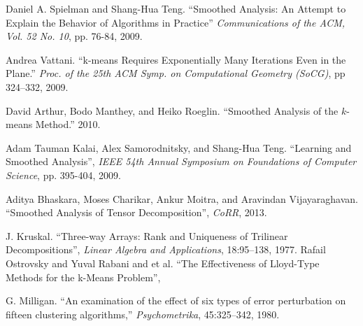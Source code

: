 \documentclass[11pt]{article}
\theoremstyle{definition}
\begin{document}
\begin{multicols}{2}
\begin{thebibliography}{1}
    Daniel A. Spielman and Shang{-}Hua Teng.
    ``Smoothed Analysis: An Attempt to Explain the Behavior of Algorithms in Practice''
    \emph{Communications of the ACM, Vol. 52 No. 10},
    pp. 76-84,
    2009.

    Andrea Vattani.
    ``k-means Requires Exponentially Many Iterations Even in the Plane.'' 
    \emph{ Proc. of the 25th ACM Symp. on Computational Geometry (SoCG)}, 
    pp 324–332, 
    2009.
    
    David Arthur, Bodo Manthey, and Heiko Roeglin.
    ``Smoothed Analysis of the $k$-means Method.''
    2010.

    Adam Tauman Kalai, Alex Samorodnitsky, and Shang{-}Hua Teng.
    ``Learning and Smoothed Analysis'',
    \emph{IEEE 54th Annual Symposium on Foundations of Computer Science}, 
    pp. 395-404,
    2009.

    Aditya Bhaskara, Moses Charikar, Ankur Moitra, and Aravindan Vijayaraghavan.
    ``Smoothed Analysis of Tensor Decomposition'',
    \emph{CoRR},
    2013.

    J. Kruskal. 
    ``Three-way Arrays: Rank and Uniqueness of Trilinear Decompositions'',
    \emph{Linear Algebra and Applications}, 
    18:95–138, 
    1977.
    Rafail Ostrovsky and Yuval Rabani and et al.
    ``The Effectiveness of Lloyd-Type Methods for the k-Means Problem'',

    G. Milligan. 
    ``An examination of the effect of six types of error perturbation on fifteen clustering
    algorithms,'' 
    \emph{Psychometrika}, 
    45:325–342, 1980.

\end{thebibliography}
\end{multicols}
\end{document}
